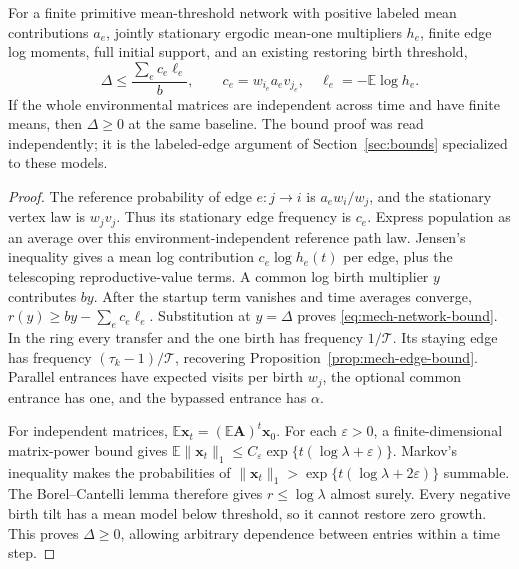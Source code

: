 \begin{lemma}\label{lem:mech-network-bound}
For a finite primitive mean-threshold network with positive labeled mean contributions \(a_e\), jointly stationary ergodic mean-one multipliers \(h_e\), finite edge log moments, full initial support, and an existing restoring birth threshold,
\begin{equation}\label{eq:mech-network-bound}
 \Delta\leq\frac{\sum_ec_e\ell_e}{b},\qquad
 c_e=w_{i_e}a_ev_{j_e},\quad \ell_e=-\mathbb E\log h_e.
\end{equation}
If the whole environmental matrices are independent across time and have finite means, then \(\Delta\geq0\) at the same baseline. The bound proof was read independently; it is the labeled-edge argument of Section~\ref{sec:bounds} specialized to these models.
\end{lemma}
\begin{proof}
The reference probability of edge \(e:j\to i\) is \(a_ew_i/w_j\), and the stationary vertex law is \(w_jv_j\). Thus its stationary edge frequency is \(c_e\). Express population as an average over this environment-independent reference path law. Jensen's inequality gives a mean log contribution \(c_e\log h_e(t)\) per edge, plus the telescoping reproductive-value terms. A common log birth multiplier \(y\) contributes \(by\). After the startup term vanishes and time averages converge,
\(r(y)\geq by-\sum_ec_e\ell_e\).
Substitution at \(y=\Delta\) proves \eqref{eq:mech-network-bound}. In the ring every transfer and the one birth has frequency \(1/\mathcal T\). Its staying edge has frequency \((\tau_k-1)/\mathcal T\), recovering Proposition~\ref{prop:mech-edge-bound}. Parallel entrances have expected visits per birth \(w_j\), the optional common entrance has one, and the bypassed entrance has \(\alpha\).

For independent matrices, \(\mathbb E\mathbf x_t=(\mathbb E\mathbf A)^t\mathbf x_0\). For each \(\varepsilon>0\), a finite-dimensional matrix-power bound gives
\(\mathbb E\|\mathbf x_t\|_1\leq C_\varepsilon\exp\{t(\log\lambda+\varepsilon)\}\).
Markov's inequality makes the probabilities of
\(\|\mathbf x_t\|_1>\exp\{t(\log\lambda+2\varepsilon)\}\)
summable. The Borel--Cantelli lemma therefore gives \(r\leq\log\lambda\) almost surely. Every negative birth tilt has a mean model below threshold, so it cannot restore zero growth. This proves \(\Delta\geq0\), allowing arbitrary dependence between entries within a time step.
\end{proof}

